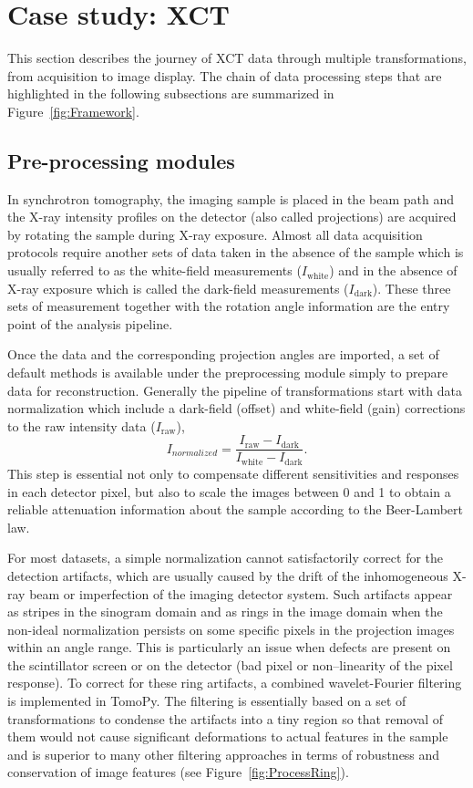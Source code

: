 \documentclass[pdf]{iucr}              %
\begin{document}
\section{Case study: XCT} 

This section describes the journey of XCT data through multiple transformations, from acquisition to image display. The chain of data processing steps that are highlighted in the following subsections are summarized in Figure~\ref{fig:Framework}. 

\subsection{Pre-processing modules} 

In synchrotron tomography, the imaging sample is placed in the beam path and the X-ray intensity profiles on the detector (also called projections) are acquired by rotating the sample during X-ray exposure. Almost all data acquisition protocols require another sets of data taken in the absence of the sample which is usually referred to as the white-field measurements ($I_{\mbox{white}}$) and in the absence of X-ray exposure which is called the dark-field measurements ($I_{\mbox{dark}}$). These three sets of measurement together with the rotation angle information are the entry point of the analysis pipeline.

Once the data and the corresponding projection angles are imported, a set of default methods is available under the preprocessing module simply to prepare data for reconstruction. Generally the pipeline of transformations start with data normalization which include a dark-field (offset) and white-field (gain) corrections to the raw intensity data ($I_{\mbox{raw}}$),
\begin{equation}
I_{normalized}=\frac{I_{\mbox{raw}}-I_{\mbox{dark}}}{I_{\mbox{white}}-I_{\mbox{dark}}}.
\end{equation}
This step is essential not only to compensate different sensitivities and responses in each detector pixel, but also to scale the images between 0 and 1 to obtain a reliable attenuation information about the sample according to the Beer-Lambert law. 

For most datasets, a simple normalization cannot satisfactorily correct for the detection artifacts, which are usually caused by the drift of the inhomogeneous X-ray beam or imperfection of the imaging detector system. Such artifacts appear as stripes in the sinogram domain and as rings in the image domain when the non-ideal normalization persists on some specific pixels in the projection images within an angle range. This is particularly an issue when defects are present on the scintillator screen or on the detector (bad pixel or non--linearity of the pixel response). To correct for these ring artifacts, a combined wavelet-Fourier filtering \cite{Munch:09} is implemented in TomoPy. The filtering is essentially based on a set of transformations to condense the artifacts into a tiny region so that removal of them would not cause significant deformations to actual features in the sample and is superior to many other filtering approaches in terms of robustness and conservation of image features (see Figure~\ref{fig:ProcessRing}).
\end{document}
